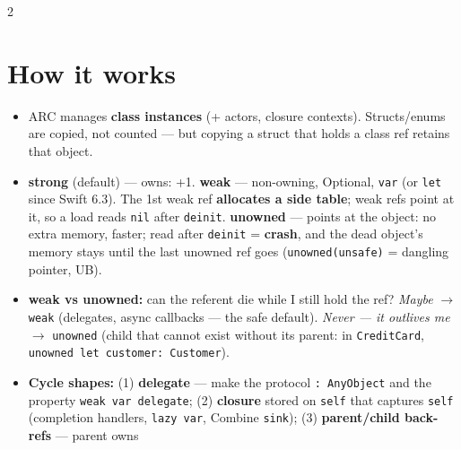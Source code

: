 \documentclass[8pt]{extarticle}
\begin{document}



\begin{multicols}{2}
\raggedright

\section{How it works}
\begin{itemize}
  \item ARC manages \textbf{class instances} (+ actors, closure contexts).
        Structs/enums are copied, not counted — but copying a struct that
        holds a class ref retains that object.
  \item \textbf{strong} (default) — owns: +1. \textbf{weak} — non-owning, Optional,
        \texttt{var} (or \texttt{let} since Swift 6.3). The 1st weak ref
        \textbf{allocates a side table}; weak refs point at it, so a load reads
        \texttt{nil} after \texttt{deinit}. \textbf{unowned} — points at the object:
        no extra memory, faster; read after \texttt{deinit} = \textbf{crash}, and the
        dead object's memory stays until the last unowned ref goes
        (\texttt{unowned(unsafe)} = dangling pointer, UB).
  \item \textbf{weak vs unowned:} can the referent die while I still hold the
        ref? \emph{Maybe} $\to$ \texttt{weak} (delegates, async callbacks —
        the safe default). \emph{Never — it outlives me} $\to$
        \texttt{unowned} (child that cannot exist without its parent:
        in \texttt{CreditCard}, \texttt{unowned let customer: Customer}).
  \item \textbf{Cycle shapes:} (1) \textbf{delegate} — make the protocol
        \texttt{: AnyObject} and the property \texttt{weak var delegate};
        (2) \textbf{closure} stored on \texttt{self} that captures
        \texttt{self} (completion handlers, \texttt{lazy var}, Combine
        \texttt{sink}); (3) \textbf{parent/child back-refs} — parent owns

\end{itemize}
\end{multicols}
\end{document}

